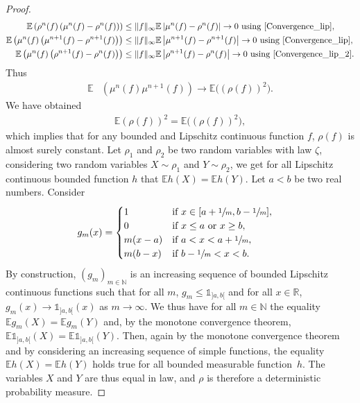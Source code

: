 \begin{proof}
\begin{align*}
\mathbb{E}\left(\rho^n(f)\left(\mu^n(f)-\rho^n(f)\right)\right)&\leq \|f\|_{\infty}\mathbb{E}\left|\mu^n(f)-\rho^n(f)\right|\to0\text{ using \eqref{Convergence_lip}},\\
\mathbb{E}\left(\mu^n(f)\left(\mu^{n+1}(f)-\rho^{n+1}(f)\right)\right)&\leq \|f\|_{\infty}\mathbb{E}\left|\mu^{n+1}(f)-\rho^{n+1}(f)\right|\to0\text{ using \eqref{Convergence_lip}},\\
\mathbb{E}\left(\mu^n(f)\left(\rho^{n+1}(f)-\rho^{n}(f)\right)\right)&\leq \|f\|_{\infty}\mathbb{E}\left|\rho^{n+1}(f)-\rho^{n}(f)\right|\to0\text{ using \eqref{Convergence_lip_2}}.
\end{align*}
Thus
\begin{align*}
\mathbb{E}&\left(\mu^{n}(f)\mu^{n+1}(f)\right)\to\mathbb{E}\bigl(\left(\rho(f)\right)^2\bigr).
\end{align*}
We have obtained
\begin{align*}
\mathbb{E}\left(\rho(f)\right)^2=\mathbb{E}\bigl(\left(\rho(f)\right)^2\bigr),
\end{align*}
which implies that for any bounded and Lipschitz continuous function $f$, $\rho(f)$ is almost surely constant. Let $\rho_1$ and $\rho_2$ be two random variables with law $\zeta$, considering two random variables $X\sim\rho_1$ and $Y\sim\rho_2$, we get for all Lipschitz continuous bounded function $h$ that $\mathbb{E}h(X)=\mathbb{E}h(Y)$. Let $a<b$ be two real numbers. Consider
\begin{align*}
g_m(x)&=\begin{cases}
1 &\text{if }x\in[a+\sfrac{1}{m},b-\sfrac{1}{m}],\\
0 &\text{if }x\leq a\text{ or }x\geq b,\\
m(x-a)&\text{if }a<x<a+\sfrac{1}{m},\\
m(b-x)&\text{if }b-\sfrac{1}{m}<x<b.
\end{cases}
\end{align*}
By construction, $(g_m)_{m\in\mathbb{N}}$ is an increasing sequence of bounded Lipschitz continuous functions such that for all $m$, $g_m\leq\mathds{1}_{]a,b[}$ and for all $x\in\mathbb{R}$, $g_m(x)\to\mathds{1}_{]a,b[}(x)$ as $m\to\infty$. We thus have for all $m\in\mathbb{N}$ the equality $\mathbb{E}g_m(X)=\mathbb{E}g_m(Y)$ and, by the monotone convergence theorem, $\mathbb{E}\mathds{1}_{]a,b[}(X)=\mathbb{E}\mathds{1}_{]a,b[}(Y)$. Then, again by the monotone convergence theorem and by considering an increasing sequence of simple functions, the equality $\mathbb{E}h(X)=\mathbb{E}h(Y)$ holds true for all bounded measurable function~$h$. The variables $X$ and $Y$ are thus equal in law, and $\rho$ is therefore a deterministic probability measure.
\end{proof}

